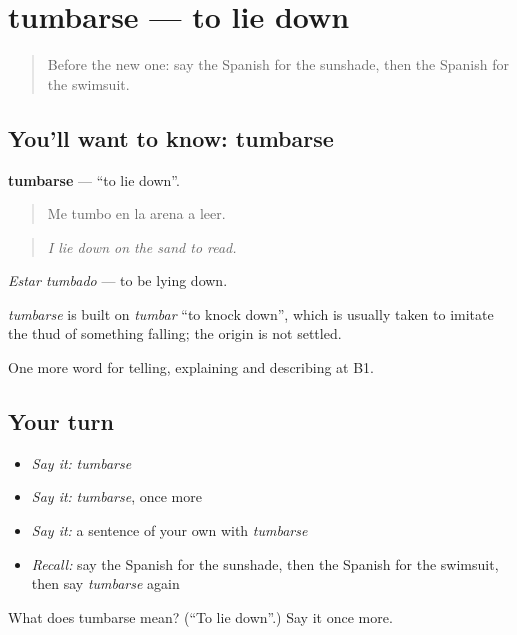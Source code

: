\section[tumbarse]{tumbarse — to lie down}

\label{lesson:ES-C690-tumbarse}



\begin{quote}
Before the new one: say the Spanish for the sunshade, then the Spanish for the swimsuit.
\end{quote}

\subsection*{You'll want to know: tumbarse}
\textbf{tumbarse} — \textquotedblleft{}to lie down\textquotedblright{}.

\begin{quote}
Me tumbo en la arena a leer.
\end{quote}

\begin{quote}
\emph{I lie down on the sand to read.}
\end{quote}

\emph{Estar tumbado} — to be lying down.

\begin{cousinweb}
\emph{tumbarse} is built on \emph{tumbar} \textquotedblleft{}to knock down\textquotedblright{}, which is usually taken to imitate the thud of something falling; the origin is not settled.
\end{cousinweb}

\begin{grammarlens}[title={What you've built}]
One more word for telling, explaining and describing at B1.
\end{grammarlens}

\subsection*{Your turn}
\begin{itemize}
\raggedright
  \item \emph{Say it:} \emph{tumbarse}
  \item \emph{Say it:} \emph{tumbarse}, once more
  \item \emph{Say it:} a sentence of your own with \emph{tumbarse}
  \item \emph{Recall:} say the Spanish for the sunshade, then the Spanish for the swimsuit, then say \emph{tumbarse} again
\end{itemize}

\begin{tcolorbox}[breakable,colback=teal!4,colframe=teal!35!black,title={Before you move on}]
What does tumbarse mean? (\textquotedblleft{}To lie down\textquotedblright{}.) Say it once more.
\end{tcolorbox}
